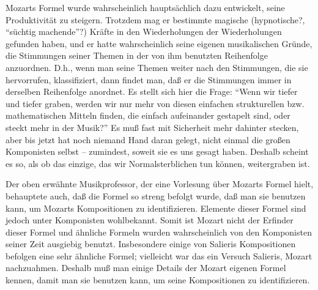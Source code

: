 Mozarts Formel wurde wahrscheinlich hauptsächlich dazu entwickelt, seine Produktivität zu steigern.
Trotzdem mag er bestimmte magische (hypnotische?, \enquote{süchtig machende}?) Kräfte in den Wiederholungen der Wiederholungen gefunden haben, und er hatte wahrscheinlich seine eigenen musikalischen Gründe, die Stimmungen seiner Themen in der von ihm benutzten Reihenfolge anzuordnen.
D.h., wenn man seine Themen weiter nach den Stimmungen, die sie hervorrufen, klassifiziert, dann findet man, daß er die Stimmungen immer in derselben Reihenfolge anordnet.
Es stellt sich hier die Frage: \enquote{Wenn wir tiefer und tiefer graben, werden wir nur mehr von diesen einfachen strukturellen bzw. mathematischen Mitteln finden, die einfach aufeinander gestapelt sind, oder steckt mehr in der Musik?}
Es muß fast mit Sicherheit mehr dahinter stecken, aber bis jetzt hat noch niemand Hand daran gelegt, nicht einmal die großen Komponisten selbst -- zumindest, soweit sie es uns gesagt haben.
Deshalb scheint es so, als ob das einzige, das wir Normalsterblichen tun können, weitergraben ist.

Der oben erwähnte Musikprofessor, der eine Vorlesung über Mozarts Formel hielt, behauptete auch, daß die Formel so streng befolgt wurde, daß man sie benutzen kann, um Mozarts Kompositionen zu identifizieren.
Elemente dieser Formel sind jedoch unter Komponisten wohlbekannt.
Somit ist Mozart nicht der Erfinder dieser Formel und ähnliche Formeln wurden wahrscheinlich von den Komponisten seiner Zeit ausgiebig benutzt.
Insbesondere einige von Salieris Kompositionen befolgen eine sehr ähnliche Formel; vielleicht war das ein Versuch Salieris, Mozart nachzuahmen.
Deshalb muß man einige Details der Mozart eigenen Formel kennen, damit man sie benutzen kann, um seine Kompositionen zu identifizieren.

